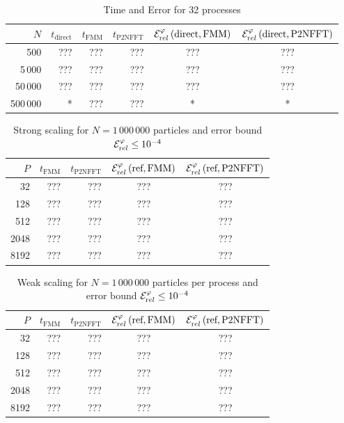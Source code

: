 \begin{table}[p]
  \centering
  \begin{tabular}{|r||r|r|r||c|c|}
    \hline
    $N$ & $t_\textrm{direct}$ & $t_\textrm{FMM}$ & $t_\textrm{P2NFFT}$ &
    \rule{0cm}{3ex}
    ${\cal E}^{\varphi}_{\mathrm rel}\left(\textrm{direct},\textrm{FMM}\right)$ &
    ${\cal E}^{\varphi}_{\mathrm rel}\left(\textrm{direct},\textrm{P2NFFT}\right)$ \\
    \hline
    500 & ??? & ??? & ??? & ??? & ??? \\
    5\,000 & ??? & ??? & ??? & ??? & ??? \\
    50\,000 & ??? & ??? & ??? & ??? & ??? \\
    500\,000& * & ??? & ??? & * & * \\
    \hline
  \end{tabular}
  \caption{Time and Error for 32 processes}
\end{table}

\begin{table}[p]
  \centering
  \begin{tabular}{|r||r|r||c|c|}
    \hline
    $P$ & $t_\textrm{FMM}$ & $t_\textrm{P2NFFT}$ &
    \rule{0cm}{3ex}
    ${\cal E}^{\varphi}_{\mathrm rel}\left(\textrm{ref},\textrm{FMM}\right)$ &
    ${\cal E}^{\varphi}_{\mathrm rel}\left(\textrm{ref},\textrm{P2NFFT}\right)$ \\
    \hline
    32   & ??? & ??? & ??? & ??? \\
    128  & ??? & ??? & ??? & ??? \\
    512  & ??? & ??? & ??? & ??? \\
    2048 & ??? & ??? & ??? & ??? \\
    8192 & ??? & ??? & ??? & ??? \\
    \hline
  \end{tabular}
  \caption{Strong scaling for $N=1\,000\,000$ particles and error bound ${\cal E}^{\varphi}_{\mathrm rel} \le 10^{-4}$}
\end{table}

\begin{table}[p]
  \centering
  \begin{tabular}{|r||r|r||c|c|}
    \hline
    $P$ & $t_\textrm{FMM}$ & $t_\textrm{P2NFFT}$ &
    \rule{0cm}{3ex}
    ${\cal E}^{\varphi}_{\mathrm rel}\left(\textrm{ref},\textrm{FMM}\right)$ &
    ${\cal E}^{\varphi}_{\mathrm rel}\left(\textrm{ref},\textrm{P2NFFT}\right)$ \\
    \hline
    32   & ??? & ??? & ??? & ??? \\
    128  & ??? & ??? & ??? & ??? \\
    512  & ??? & ??? & ??? & ??? \\
    2048 & ??? & ??? & ??? & ??? \\
    8192 & ??? & ??? & ??? & ??? \\
    \hline
  \end{tabular}
  \caption{Weak scaling for $N=1\,000\,000$ particles per process and error bound ${\cal E}^{\varphi}_{\mathrm rel} \le 10^{-4}$}
\end{table}

